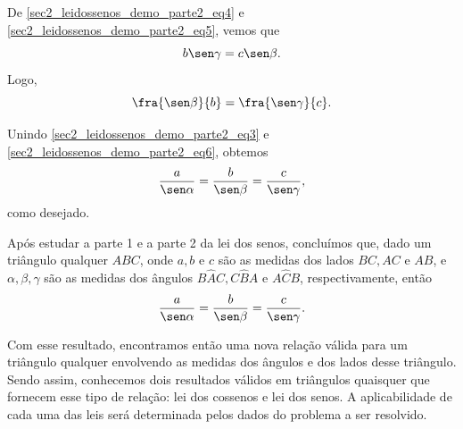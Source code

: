 De \eqref{sec2_leidossenos_demo_parte2_eq4} e \eqref{sec2_leidossenos_demo_parte2_eq5}, vemos que
$$b \sen\gamma = c \sen\beta.$$
Logo,
\begin{equation}
\fra{\sen\beta}{b}=\fra{\sen\gamma}{c}.    \label{sec2_leidossenos_demo_parte2_eq6}
\end{equation}

Unindo \eqref{sec2_leidossenos_demo_parte2_eq3} e \eqref{sec2_leidossenos_demo_parte2_eq6}, obtemos
$$\frac{a}{\sen\alpha} = \frac{b}{\sen\beta} = \frac{c}{\sen\gamma},$$
como desejado.

Após estudar a parte 1 e a parte 2 da lei dos senos, concluímos que, dado um triângulo qualquer $ABC$, onde $a, b$ e $c$ são as medidas dos lados $BC, AC$ e $AB$, e $\alpha, \beta, \gamma$ são as medidas dos ângulos $B\hat{A}C,C\hat{B}A$ e $A\hat{C}B$, respectivamente, então
    $$\frac{a}{\sen\alpha} = \frac{b}{\sen\beta} = \frac{c}{\sen\gamma}.$$

Com esse resultado, encontramos então uma nova relação válida para um triângulo qualquer envolvendo as medidas dos ângulos e dos lados desse triângulo. Sendo assim, conhecemos dois resultados válidos em triângulos quaisquer que fornecem esse tipo de relação: lei dos cossenos e lei dos senos. A aplicabilidade de cada uma das leis será determinada pelos dados do problema a ser resolvido.

